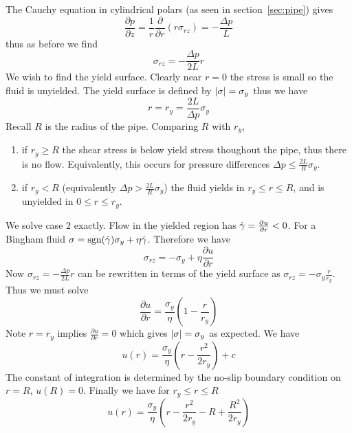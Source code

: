 \documentclass{jknotes}
\begin{document}
The Cauchy equation in cylindrical polars (as seen in section~\ref{sec:pipe})
gives
\begin{equation}
	\frac{\partial p}{\partial z} = \frac{1}{r} \frac{\partial}{\partial r}
	\left( r \sigma_{rz} \right) = -\frac{\Delta p}{L}
\end{equation}
thus as before we find
\begin{equation}
	\sigma_{rz} = -\frac{\Delta p}{2L} r
\end{equation}
We wish to find the yield surface. Clearly near $r=0$ the stress is small
so the fluid is unyielded. The yield surface is defined by $\abs{\sigma} =
\sigma_y$ thus we have
\begin{equation}
	r = r_y = \frac{2L}{\Delta p} \sigma_y
\end{equation}
Recall $R$ is the radius of the pipe. Comparing $R$ with $r_y$,
\begin{enumerate}
	\item if $r_y \ge R$ the shear stress is below yield stress thoughout the
		pipe, thus there is no flow. Equivalently, this occurs for pressure
		differences $\Delta p \le \frac{2L}{R} \sigma_y$.
	\item if $r_y < R$ (equivalently $\Delta p > \frac{2L}{R} \sigma_y$) the
		fluid yields in $r_y \le r \le R$, and is unyielded in $0 \le r \le
		r_y$.
\end{enumerate}

We solve case 2 exactly. Flow in the yielded region has $\dot{\gamma} =
\frac{\partial u}{\partial r} < 0$. For a Bingham fluid $\sigma =
\text{sgn}(\dot{\gamma}) \sigma_y + \eta \dot{\gamma}$. Therefore we have
\begin{equation}
	\sigma_{rz} = -\sigma_y + \eta \frac{\partial u}{\partial r}
\end{equation}
Now $\sigma_{rz} = -\frac{\Delta p}{2L} r$ can be rewritten in terms of the
yield surface as $\sigma_{rz} = -\sigma_y \frac{r}{r_y}$. Thus we must solve
\begin{equation}
	\frac{\partial u}{\partial r} = \frac{\sigma_y}{\eta}\left( 1 -
	\frac{r}{r_y}\right)
\end{equation}
Note $r = r_y$ implies $\frac{\partial u}{\partial r} = 0$ which gives
$\abs{\sigma} = \sigma_y$ as expected. We have
\begin{equation}
u(r) = \frac{\sigma_y}{\eta} \left(r - \frac{r^2}{2r_y}\right) + c
\end{equation}
The constant of integration is determined by the no-slip boundary condition on
$r=R$, $u(R) = 0$. Finally we have for $r_y \le r \le R$
\begin{equation}
	u(r) = \frac{\sigma_y}{\eta} \left( r - \frac{r^2}{2r_y} - R +
	\frac{R^2}{2r_y}\right)
\end{equation}
\end{document}
